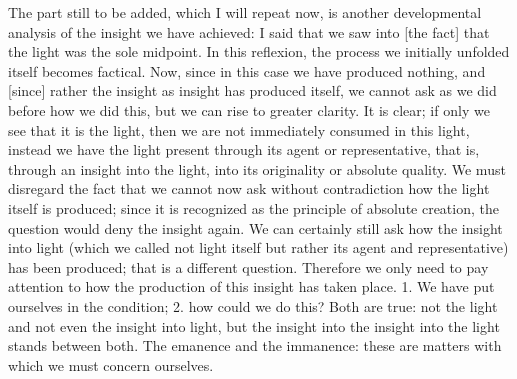 The part still to be added, which I will repeat now,
is another developmental analysis
of the insight we have achieved:
I said that we saw into [the fact]
that the light was the sole midpoint.
In this reflexion, the process we initially unfolded
itself becomes factical.
Now, since in this case we have produced nothing,
and [since] rather the insight as insight has produced itself,
we cannot ask as we did before how we did this,
but we can rise to greater clarity.
It is clear; if only we see that it is the light,
then we are not immediately consumed in this light,
instead we have the light present
through its agent or representative,
that is, through an insight into the light,
into its originality or absolute quality.
We must disregard the fact that
we cannot now ask without contradiction
how the light itself is produced;
since it is recognized as
the principle of absolute creation,
the question would deny the insight again.
We can certainly still ask how
the insight into light
(which we called not light itself
but rather its agent and representative)
has been produced; that is a different question.
Therefore we only need to pay
attention to how the production of this insight has taken place.
1. We have put ourselves in the condition;
2. how could we do this?
Both are true:
not the light and not even the insight into light,
but the insight into the insight into the light
stands between both.
The emanence and the immanence:
these are matters with which we must concern ourselves.

